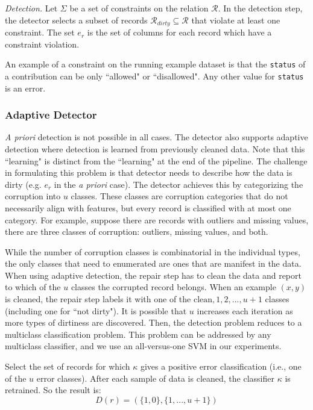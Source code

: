 \vspace{0.5em}

\emph{Detection. } Let $\Sigma$ be a set of constraints on the relation $\mathcal{R}$. 
In the detection step, the detector selects a subset of records $\mathcal{R}_{dirty} \subseteq \mathcal{R}$ that violate at least one constraint.
The set $e_r$ is the set of columns for each record which have a constraint violation. 

\begin{example}\label{detex1}
An example of a constraint on the running example dataset is that the \texttt{status} of
a contribution can be only ``allowed" or ``disallowed".
Any other value for \texttt{status} is an error.
\end{example}

\subsubsection{Adaptive Detector}
\emph{A priori} detection is not possible in all cases.
The detector also supports adaptive detection where detection is learned from previously cleaned data.
Note that this ``learning" is distinct from the ``learning" at the end of the pipeline.
The challenge in formulating this problem is that detector needs to describe how the data is dirty (e.g. $e_r$ in the \emph{a priori} case).
The detector achieves this by categorizing the corruption into $u$ classes.
These classes are corruption categories that do not necessarily align with features, but every record is classified with at most one category.
For example, suppose there are records with outliers and missing values, there are three classes of corruption: outliers, missing values, and both.

While the number of corruption classes is combinatorial in the individual types, the only classes that need to enumerated are ones that are manifest in the data.
When using adaptive detection, the repair step has to clean the data and report to which of the $u$ classes the corrupted record belongs.
When an example $(x,y)$ is cleaned, the repair step labels it with one of the ${\text{clean}, 1,2,...,u+1}$ classes (including one for ``not dirty").
It is possible that $u$ increases each iteration as more types of dirtiness are discovered. 
Then, the detection problem reduces to a multiclass classification problem.
This problem can be addressed by any multiclass classifier, and we use an all-versus-one SVM in our experiments.

\begin{definition}
Select the set of records for which $\kappa$ gives a positive error classification (i.e., one of the $u$ error classes).
After each sample of data is cleaned, the classifier $\kappa$ is retrained.
So the result is:
\[D(r) = (\{1,0\},\{1,...,u+1\})\]
\end{definition}

